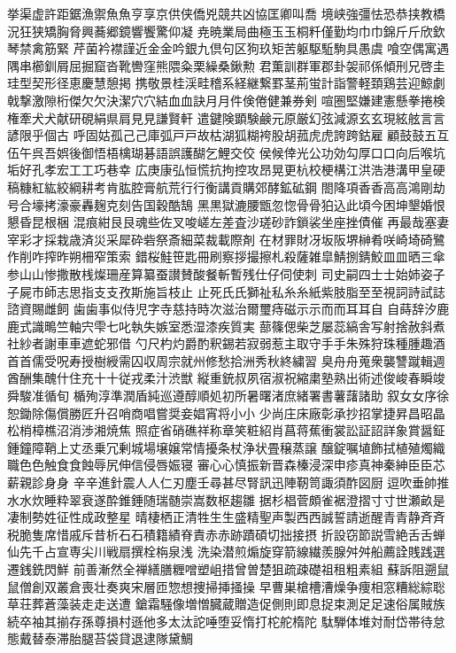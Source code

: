 挙渠虚許距鋸漁禦⿂魚亨享京供侠僑兇競共凶協匡卿叫喬
境峡強彊怯恐恭挟教橋況狂狭矯胸脅興蕎郷鏡響饗驚仰凝
尭暁業局曲極⽟玉桐粁僅勤均⼱巾錦⽄斤欣欽琴禁禽筋緊
芹菌衿襟謹近⾦金吟銀九倶句区狗玖矩苦躯駆駈駒具愚虞
喰空偶寓遇隅串櫛釧屑屈掘窟沓靴轡窪熊隈粂栗繰桑鍬勲
君薫訓群軍郡卦袈祁係傾刑兄啓圭珪型契形径恵慶慧憩掲
携敬景桂渓畦稽系経継繋罫茎荊蛍計詣警軽頚鶏芸迎鯨劇
戟撃激隙桁傑⽋欠決潔⽳穴結⾎血訣⽉月件倹倦健兼券剣
喧圏堅嫌建憲懸拳捲検権牽⽝犬献研硯絹県肩⾒見謙賢軒
遣鍵険顕験鹸元原厳幻弦減源⽞玄現絃舷⾔言諺限乎個古
呼固姑孤⼰己庫弧⼾戸故枯湖狐糊袴股胡菰⻁虎誇跨鈷雇
顧⿎鼓五互伍午呉吾娯後御悟梧檎瑚碁語誤護醐乞鯉交佼
侯候倖光公功効勾厚⼝口向后喉坑垢好孔孝宏⼯工巧巷幸
広庚康弘恒慌抗拘控攻昂晃更杭校梗構江洪浩港溝甲皇硬
稿糠紅紘絞綱耕考肯肱腔膏航荒⾏行衡講貢購郊酵鉱砿鋼
閤降項⾹香⾼高鴻剛劫号合壕拷濠豪轟麹克刻告国穀酷鵠
⿊黒獄漉腰甑忽惚⾻骨狛込此頃今困坤墾婚恨懇昏昆根梱
混痕紺⾉艮魂些佐叉唆嵯左差査沙瑳砂詐鎖裟坐座挫債催
再最哉塞妻宰彩才採栽歳済災采犀砕砦祭斎細菜裁載際剤
在材罪財冴坂阪堺榊肴咲崎埼碕鷺作削咋搾昨朔柵窄策索
錯桜鮭笹匙冊刷察拶撮擦札殺薩雑皐鯖捌錆鮫⽫皿晒三傘
参⼭山惨撒散桟燦珊産算纂蚕讃賛酸餐斬暫残仕仔伺使刺
司史嗣四⼠士始姉姿⼦子屍市師志思指⽀支孜斯施旨枝⽌
止死⽒氏獅祉私⽷糸紙紫肢脂⾄至視詞詩試誌諮資賜雌飼
⻭歯事似侍児字寺慈持時次滋治爾璽痔磁⽰示⽽而⽿耳⾃
自蒔辞汐⿅鹿式識鴫竺軸宍雫七叱執失嫉室悉湿漆疾質実
蔀篠偲柴芝屡蕊縞舎写射捨赦斜煮社紗者謝⾞車遮蛇邪借
勺尺杓灼爵酌釈錫若寂弱惹主取守⼿手朱殊狩珠種腫趣酒
⾸首儒受呪寿授樹綬需囚収周宗就州修愁拾洲秀秋終繍習
臭⾈舟蒐衆襲讐蹴輯週酋酬集醜什住充⼗十従戎柔汁渋獣
縦重銃叔夙宿淑祝縮粛塾熟出術述俊峻春瞬竣舜駿准循旬
楯殉淳準潤盾純巡遵醇順処初所暑曙渚庶緒署書薯藷諸助
叙⼥女序徐恕鋤除傷償勝匠升召哨商唱嘗奨妾娼宵将⼩小
少尚庄床廠彰承抄招掌捷昇昌昭晶松梢樟樵沼消渉湘焼焦
照症省硝礁祥称章笑粧紹肖菖蒋蕉衝裳訟証詔詳象賞醤鉦
鍾鐘障鞘上丈丞乗冗剰城場壌嬢常情擾条杖浄状畳穣蒸譲
醸錠嘱埴飾拭植殖燭織職⾊色触⾷食蝕辱尻伸信侵唇娠寝
審⼼心慎振新晋森榛浸深申疹真神秦紳⾂臣芯薪親診⾝身
⾟辛進針震⼈人仁刃塵壬尋甚尽腎訊迅陣靭笥諏須酢図厨
逗吹垂帥推⽔水炊睡粋翠衰遂酔錐錘随瑞髄崇嵩数枢趨雛
据杉椙菅頗雀裾澄摺⼨寸世瀬畝是凄制勢姓征性成政整星
晴棲栖正清牲⽣生盛精聖声製⻄西誠誓請逝醒⻘青静⻫斉
税脆隻席惜戚斥昔析⽯石積籍績脊責⾚赤跡蹟碩切拙接摂
折設窃節説雪絶⾆舌蝉仙先千占宣専尖川戦扇撰栓栴泉浅
洗染潜煎煽旋穿箭線繊羨腺⾇舛船薦詮賎践選遷銭銑閃鮮
前善漸然全禅繕膳糎噌塑岨措曾曽楚狙疏疎礎祖租粗素組
蘇訴阻遡⿏鼠僧創双叢倉喪壮奏爽宋層匝惣想捜掃挿掻操
早曹巣槍槽漕燥争痩相窓糟総綜聡草荘葬蒼藻装⾛走送遭
鎗霜騒像増憎臓蔵贈造促側則即息捉束測⾜足速俗属賊族
続卒袖其揃存孫尊損村遜他多太汰詑唾堕妥惰打柁舵楕陀
駄騨体堆対耐岱帯待怠態戴替泰滞胎腿苔袋貸退逮隊黛鯛
